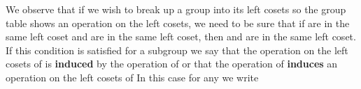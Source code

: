 \documentclass[11pt,oneside]{article}
\begin{document}
\begin{BookBody}
\noindent We observe that if we wish to break up a group into its left cosets so the group table shows an operation on the left cosets, we need to be sure that if  are in the same 
left coset and  are in the same left coset, then  and  are in the same left coset. If this condition is satisfied for a subgroup  we say that the operation on the left cosets of  is\textbf{ induced} by the operation of  or that the operation of  \textbf{induces} an operation on the left cosets of  In this case for any  we write

\end{BookBody}

\BookNarrativetrue
\end{document}

